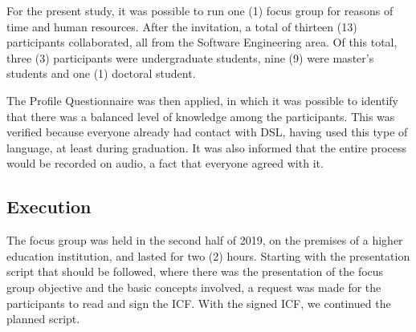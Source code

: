 \documentclass[a4paper,twoside,anonymous]{article}
\begin{document}
For the present study, it was possible to run one (1) focus group for reasons of time and human resources.
After the invitation, a total of thirteen (13) participants collaborated, all from the Software Engineering area.
Of this total, three (3) participants were undergraduate students, nine (9) were master's students and one (1) doctoral student.

The Profile Questionnaire was then applied, in which it was possible to identify that there was a balanced level of knowledge among the participants.
This was verified because everyone already had contact with DSL, having used this type of language, at least during graduation.
It was also informed that the entire process would be recorded on audio, a fact that everyone agreed with it.

\subsection{Execution}

The focus group was held in the second half of 2019, on the premises of a higher education institution, and lasted for two (2) hours.
Starting with the presentation script that should be followed, where there was the presentation of the focus group objective and the basic concepts involved, a request was made for the participants to read and sign the ICF.
With the signed ICF, we continued the planned script.
\end{document}
